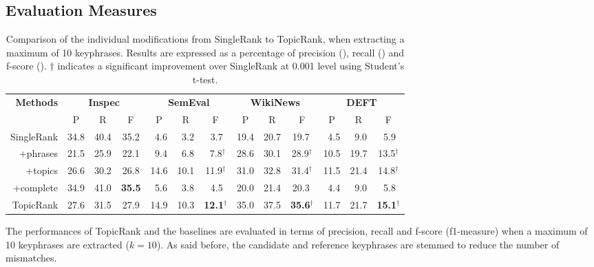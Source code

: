   \subsection{Evaluation Measures}
  \label{subsec:measures}
    \begin{table}
      \centering
      \begin{tabular}{@{ }rcccccccccccc@{ }}
        \toprule
        \multirow{2}{*}[-2pt]{\textbf{Methods}} & \multicolumn{3}{c}{\textbf{Inspec}} & \multicolumn{3}{c}{\textbf{SemEval}} & \multicolumn{3}{c}{\textbf{WikiNews}} & \multicolumn{3}{c}{\textbf{DEFT}}\\
        \cmidrule(lr){2-4}\cmidrule(lr){5-7}\cmidrule(lr){8-10}\cmidrule(l){11-13}
        & P & R & F & P & R & F & P & R & F & P & R & F\\
        \midrule
        SingleRank & 34.8 & 40.4 & 35.2 & $~~$4.6 & $~~$3.2 & $~~$3.7$^{~}$ & 19.4 & 20.7 & 19.7$^{~}$ & $~~$4.5 & $~~$9.0 & $~~$5.9$^{~}$\\
        +phrases & 21.5 & 25.9 & 22.1 & $~~$9.4 & $~~$6.8 & $~~$7.8$^\dagger$ & 28.6 & 30.1 & 28.9$^\dagger$ & 10.5 & 19.7 & 13.5$^\dagger$\\
        +topics & 26.6 & 30.2 & 26.8 & 14.6 & 10.1 & 11.9$^\dagger$ & 31.0 & 32.8 & 31.4$^\dagger$ & 11.5 & 21.4 & 14.8$^\dagger$\\
        +complete & 34.9 & 41.0 & \textbf{35.5} & $~~$5.6 & $~~$3.8 & $~~$4.5$^{~}$ & 20.0 & 21.4 & 20.3${~}$ & $~~$4.4 & $~~$9.0 & $~~$5.8$^{~}$\\
        TopicRank & 27.6 & 31.5 & 27.9  & 14.9 & 10.3 & \textbf{12.1}$^\dagger$ & 35.0 & 37.5 & \textbf{35.6}$^\dagger$ & 11.7 & 21.7 & \textbf{15.1}$^\dagger$\\
        \bottomrule
      \end{tabular}
      \caption{Comparison of the individual modifications from SingleRank to
               TopicRank, when extracting a maximum of 10 keyphrases. Results
               are expressed as a percentage of precision (), recall
               () and f-score (). $\dagger$ indicates a
               significant improvement over SingleRank at 0.001 level using
               Student's t-test.
               \label{tab:singlerank_improvements}}
    \end{table}

    The performances of TopicRank and the baselines are evaluated in terms of
    precision, recall and f-score (f1-measure) when a maximum of 10 keyphrases
    are extracted ($k = 10$). As said before, the candidate and reference
    keyphrases are stemmed to reduce the number of mismatches.

